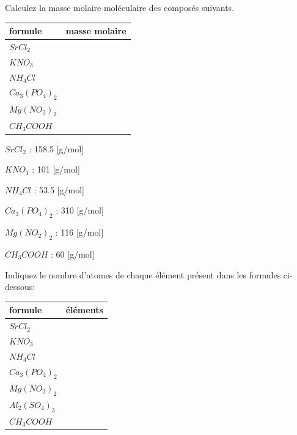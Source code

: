 \documentclass[
  11pt,
  a4paper,
  openany]{book}
\begin{document}
\begin{Exercise}
Calculez la masse molaire moléculaire des composés suivants.

\end{Exercise}

\begin{longtable}[]{@{}lc@{}}
\toprule()
formule & masse molaire \\
\midrule()
\endhead
\(SrCl_2\) & \\
\(KNO_3\) & \\
\(NH_4Cl\) & \\
\(Ca_3(PO_4)_2\) & \\
\(Mg(NO_2)_2\) & \\
\(CH_3COOH\) & \\
\bottomrule()
\end{longtable}

\begin{Answer}

\begin{multicols}{2}
\(SrCl_2\) : 158.5 {[}g/mol{]}

\(KNO_3\) : 101 {[}g/mol{]}

\(NH_4Cl\) : 53.5 {[}g/mol{]}

\(Ca_3(PO_4)_2\) : 310 {[}g/mol{]}

\(Mg(NO_2)_2\) : 116 {[}g/mol{]}

\(CH_3COOH\) : 60 {[}g/mol{]}

\end{multicols}

\end{Answer}

\begin{Exercise}
Indiquez le nombre d'atomes de chaque élément présent dans les formules ci-dessous:

\end{Exercise}

\begin{longtable}[]{@{}lc@{}}
\toprule()
formule & éléments \\
\midrule()
\endhead
\(SrCl_2\) & \includegraphics{images/1px.png} \\
\(KNO_3\) & \\
\(NH_4Cl\) & \\
\(Ca_3(PO_4)_2\) & \\
\(Mg(NO_2)_2\) & \\
\(Al_2(SO_4)_3\) & \\
\(CH_3COOH\) & \\
\bottomrule()
\end{longtable}
\end{document}
